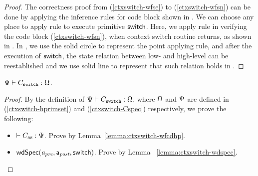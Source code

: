 \begin{proof}
    The correctness proof from
    (\ref{ctxswitch-wfse}) to (\ref{ctxswitch-wfsn})
    can be done by applying the inference rules for
    code block shown in
    \Fig{\ref{fig:Selected Inference Rules for Refinement Verification}}.
    We can choose any place to apply
     rule to execute primitive $\mathsf{switch}$.
    Here, we apply  rule
    in verifying the code block
    \SwitchNewTask{} (\ref{ctxswitch-wfsn}),
    when context switch routine returns,
    as shown in \Fig{\ref{fig:refinement reasoning}}.
    In \Fig{\ref{fig:refinement reasoning}}, we use the
    solid circle to represent the point applying  rule,
    and after the execution of $\mathsf{switch}$, the
    state relation between low- and high-level can
    be reestablished and we use solid line to represent
    that such relation holds in \Fig{\ref{fig:refinement reasoning}}.
\end{proof}

\begin{theorem}
    \em
    ${\Psi} \vdash {C_{\texttt{switch}}} : {\Omega}$.
\end{theorem}
\begin{proof}
    By the definition of
    ${\Psi} \vdash {C_{\texttt{switch}}} : {\Omega}$,
    where $\Omega$ and $\Psi{}$ are defined in
    (\ref{ctxswitch-hprimset}) and (\ref{ctxswitch-Cspec})
    respectively, we prove the following:
    \begin{itemize}
        \item $\vdash {C_{\text{as}}} : {\Psi{}}$.
            Prove by Lemma~\ref{lemma:ctxswitch-wfcdhp}.
        \item $\textsf{wdSpec}({\textit{a}_\textit{pre}}, {\mathsf{a}_{\textit{post}}}, {\mathsf{switch}})$.
            Prove by Lemma ~\ref{lemma:ctxswitch-wdspec}.
    \end{itemize}
\end{proof}

